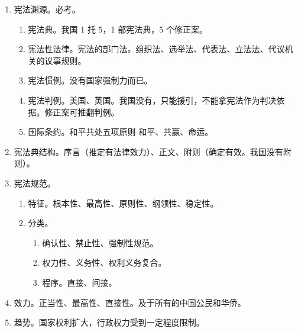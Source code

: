 \begin{enumerate}
\begin{enumerate}
          \item 52 条修正案。
                \begin{enumerate}
                  \item 88。邓。私营。
                  \item 93。邓。国营改国有、市场经济、初级阶段、多党合作政治协商。
                  \item 99。江。依法治国、反革命改危害国家安全、个体私营改非公有、公有制为主体。
                  \item 04。胡。人权、紧急状态、社会保障、建设者入站；增加国歌、国事访问、特区人大、政治文明。
                  \item 18。习。社会生态、和谐美丽、伟大复兴、科学发展、习近平。
                  \item 民营经济。88 补充，93 市场，99 重要，04 加上鼓励和支持。
                  \item 土地。88 转，93 分，99 统，04 征。
                  \item 任期。93 县，04 乡，3 改 5。
                  \item 04 建设，18 复兴。
                \end{enumerate}
        \end{enumerate}
  \item 宪法渊源。必考。
        \begin{enumerate}
          \item 宪法典。我国 1 托 5，1 部宪法典，5 个修正案。
          \item 宪法性法律。宪法的部门法。组织法、选举法、代表法、立法法、代议机关的议事规则。
          \item 宪法惯例。没有国家强制力而已。
          \item 宪法判例。美国、英国。我国没有，只能援引，不能拿宪法作为判决依据。修正案可推翻判例。
          \item 国际条约。和平共处五项原则 \yjt 和平、共赢、命运。
        \end{enumerate}
  \item 宪法典结构。序言（推定有法律效力）、正文、附则（\yi 确定有效。\er 我国没有附则）。
  \item 宪法规范。
        \begin{enumerate}
          \item 特征。根本性、最高性、原则性、纲领性、稳定性。
          \item 分类。
                \begin{enumerate}
                  \item 确认性、禁止性、强制性规范。
                  \item 权力性、义务性、权利义务复合。
                  \item 程序。直接、间接。
                \end{enumerate}
        \end{enumerate}
  \item 效力。正当性、最高性、直接性。及于所有的中国公民和华侨。
  \item 趋势。国家权利扩大，行政权力受到一定程度限制。
\end{enumerate}
